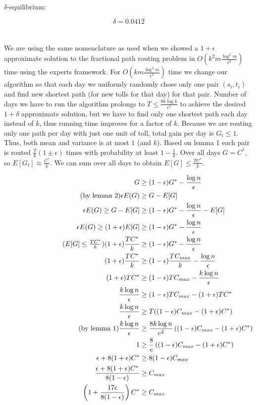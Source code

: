 \documentclass[a4paper,11pt,oneside,onecolumn]{article}
\newcommand{\comment}[1]{%
  \text{\phantom{(#1)}} \tag{#1}
}
\begin{document}
$\delta$-equilibrium:

$$
\delta = 0.0412
$$

\section{}

We are using the same nomenclature as used when we showed a $1 + \epsilon$ approximate solution to the fractional path
routing problem in $O(k^2m\frac{\log^2 m}{\epsilon^2})$ time using the experts framework. For
$O(km\frac{\log^2 m}{\epsilon^2})$ time we change our algorithm so that each day we uniformly randomly chose only one
pair $(s_i, t_i)$ and find new shortest path (for new tolls for that day) for that pair. Number of days we have to run the
algorithm prolongs to $T \le \frac{8k \log k}{\epsilon ^2}$ to achieve the desired $1+\delta$ approximate solution, but we have to
find only one shortest path each day instead of $k$, thus running time improves for a factor of $k$.
Because we are routing only one path per day with just one unit of toll, total gain per day is $G_t \le 1$. Thus,
both mean and variance is at most $1$ (and $k$). Based on lemma 1 each pair is routed $\frac{T}{k}(1 \pm \epsilon)$ times
with probability at least $1 - \frac{1}{k}$. Over all days $G=C^*$, so $E[G_t] \approx \frac{C^*}{k}$. We can sum over all days to
obtain $E[G] \le \frac{TC^*}{k} $.

\begin{align*}
G & \ge (1-\epsilon) G^* - \frac{\log n}{\epsilon} \\
\comment{by lemma 2} \epsilon E(G) & \ge G - E[G] \\
\epsilon E(G) \ge G - E[G] & \ge (1-\epsilon) G^* - \frac{\log n}{\epsilon} - E[G] \\
\epsilon E(G) \ge (1 + \epsilon) E[G] & \ge (1-\epsilon) G^* - \frac{\log n}{\epsilon} \\
\comment{$E[G] \le \frac{TC^*}{k} $} (1 + \epsilon) \frac{T C^*}{k} & \ge (1-\epsilon) G^* - \frac{\log n}{\epsilon} \\
(1 + \epsilon) \frac{T C^*}{k} & \ge (1-\epsilon) \frac{TC_{max}}{k} - \frac{\log n}{\epsilon} \\
(1 + \epsilon) T C^* & \ge (1-\epsilon) TC_{max} - \frac{k \log n}{\epsilon} \\
\frac{k \log n}{\epsilon} & \ge (1-\epsilon) TC_{max} - (1 + \epsilon) T C^* \\
\frac{k \log n}{\epsilon} & \ge T ( (1-\epsilon) C_{max} - (1 + \epsilon) C^* ) \\
\comment{by lemma 1} \frac{k \log n}{\epsilon} & \ge \frac{8k \log n}{e^2} \left( (1-\epsilon) C_{max} - (1 + \epsilon) C^* \right) \\
1 & \ge \frac{8}{e} \left( (1-\epsilon) C_{max} - (1 + \epsilon) C^* \right) \\
\epsilon + 8 (1 + \epsilon) C^* & \ge 8 (1-\epsilon) C_{max} \\
\frac{\epsilon + 8 (1 + \epsilon) C^*}{8 (1-\epsilon) } & \ge C_{max} \\
\left( 1 + \frac{17 \epsilon }{8 (1-\epsilon) } \right) C^* & \ge C_{max} \\
\end{align*}
\end{document}
